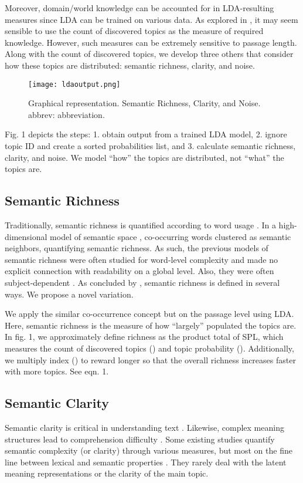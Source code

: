 \documentclass[11pt]{article}
\begin{document}
Moreover, domain/world knowledge can be accounted for in LDA-resulting measures since LDA can be trained on various data. As explored in \citet{qumsiyeh2011readaid}, it may seem sensible to use the count of discovered topics as the measure of required knowledge. However, such measures can be extremely sensitive to passage length. Along with the count of discovered topics, we develop three others that consider how these topics are distributed: semantic richness, clarity, and noise. 

\begin{figure}[]
    \centering
    \texttt{[image: ldaoutput.png]}
    \caption{Graphical representation. Semantic Richness, Clarity, and Noise. abbrev: abbreviation.}
    \label{fig:1}
\end{figure}

Fig. 1 depicts the steps: 1. obtain output from a trained LDA model, 2. ignore topic ID and create a sorted probabilities list, and 3. calculate semantic richness, clarity, and noise. We model ``how'' the topics are distributed, not ``what'' the topics are.

\subsection{Semantic Richness}
Traditionally, semantic richness is quantified according to word usage \citep{pexman:08}. In a high-dimensional model of semantic space \citep{li2000acquisition}, co-occurring words clustered as semantic neighbors, quantifying semantic richness. As such, the previous models of semantic richness were often studied for word-level complexity and made no explicit connection with readability on a global level. Also, they were often subject-dependent \citep{buchanan2001characterizing}. As concluded by \citet{pexman:08}, semantic richness is defined in several ways. We propose a novel variation.

We apply the similar co-occurrence concept but on the passage level using LDA. Here, semantic richness is the measure of how ``largely'' populated the topics are. In fig. 1, we approximately define richness as the product total of SPL, which measures the count of discovered topics () and topic probability (). Additionally, we multiply index () to reward longer  so that the overall richness increases faster with more topics. See eqn. 1.



\subsection{Semantic Clarity}
Semantic clarity is critical in understanding text \cite{peabody2016towards}. Likewise, complex meaning structures lead to comprehension difficulty \citep{pires2017towards}. Some existing studies quantify semantic complexity (or clarity) through various measures, but most on the fine line between lexical and semantic properties \citep{Collins-Thompson:14}. They rarely deal with the latent meaning representations or the clarity of the main topic.
\end{document}
